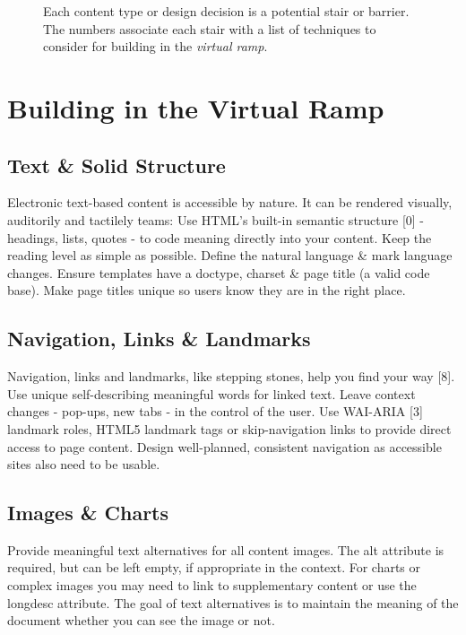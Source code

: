 \documentclass{acm_proc_article-sp}
\begin{document}
\begin{figure*}
\centering
{}
\caption{Each content type or design decision is a potential stair or barrier. The numbers associate each stair with a list of techniques to consider for building in the \textit{virtual ramp}.}
\end{figure*}

\section{Building in the {\secit Virtual} Ramp}

\subsection{Text \& Solid Structure}

Electronic text-based content is accessible by nature. It can be rendered visually, auditorily and tactilely teams: Use HTML's built-in semantic structure [0] - headings, lists, quotes - to code meaning directly into your content. Keep the reading level as simple as possible. Define the natural language \& mark language changes. Ensure templates have a doctype, charset \& page title (a valid code base). Make page titles unique so users know they are in the right place.

\subsection{Navigation, Links \& Landmarks}
Navigation, links and landmarks, like stepping stones, help you find your way [8]. Use unique self-describing meaningful words for linked text. Leave context changes - pop-ups, new tabs - in the control of the user. Use WAI-ARIA [3] landmark roles, HTML5 landmark tags or skip-navigation links to provide direct access to page content. Design well-planned, consistent navigation as accessible sites also need to be usable.

\subsection{Images \& Charts}
Provide meaningful text alternatives for all content images. The alt attribute is required, but can be left empty, if appropriate in the context. For charts or complex images you may need to link to supplementary content or use the longdesc attribute. The goal of text alternatives is to maintain the meaning of the document whether you can see the image or not.
\end{document}
